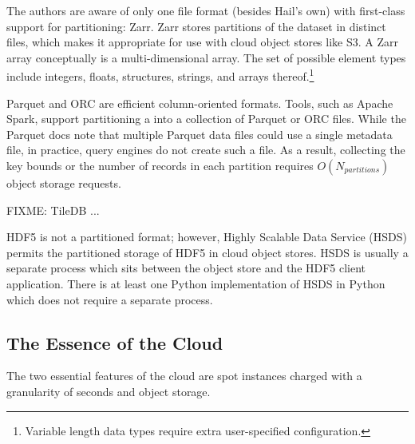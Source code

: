 \documentclass[sigconf, nonacm]{acmart}
\begin{document}
The authors are aware of only one file format (besides Hail's own) with first-class support for
partitioning: Zarr. Zarr stores partitions of the dataset in distinct files, which makes it
appropriate for use with cloud object stores like S3. A Zarr array conceptually is a
multi-dimensional array. The set of possible element types include integers, floats, structures,
strings, and arrays thereof.\footnote{Variable length data types require extra user-specified
configuration.}

Parquet and ORC are efficient column-oriented formats. Tools, such as Apache Spark, support
partitioning a into a collection of Parquet or ORC files. While the Parquet docs note that multiple
Parquet data files could use a single metadata file, in practice, query engines do not create such a
file. As a result, collecting the key bounds or the number of records in each partition requires
$O(N_{partitions})$ object storage requests.

FIXME: TileDB ...

HDF5 is not a partitioned format; however, Highly Scalable Data Service (HSDS) permits the
partitioned storage of HDF5 in cloud object stores. HSDS is usually a separate process which sits
between the object store and the HDF5 client application. There is at least one Python
implementation of HSDS in Python which does not require a separate process.

\subsection{The Essence of the Cloud}

The two essential features of the cloud are spot instances charged with a granularity of seconds and
object storage.










\end{document}
